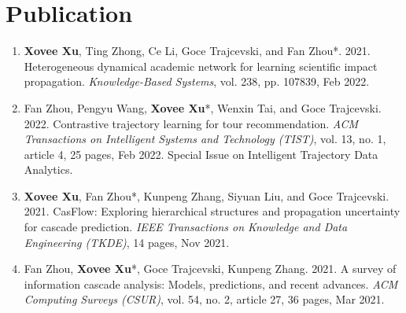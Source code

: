 \section*{Publication}
\indent



\begin{enumerate}[resume]
    \item \textbf{Xovee Xu}, Ting Zhong, Ce Li, Goce Trajcevski, and Fan Zhou*. 2021. Heterogeneous dynamical academic network for learning scientific impact propagation. \textit{Knowledge-Based Systems}, vol. 238, pp. 107839, Feb 2022.
    \item Fan Zhou, Pengyu Wang, \textbf{Xovee Xu}*, Wenxin Tai, and Goce Trajcevski. 2022. Contrastive trajectory learning for tour recommendation. \textit{ACM Transactions on Intelligent Systems and Technology (TIST)}, vol. 13, no. 1, article 4, 25 pages, Feb 2022. Special Issue on Intelligent Trajectory Data Analytics.
    \item \textbf{Xovee Xu}, Fan Zhou*, Kunpeng Zhang, Siyuan Liu, and Goce Trajcevski. 2021. CasFlow: Exploring hierarchical structures and propagation uncertainty for cascade prediction. \textit{IEEE Transactions on Knowledge and Data Engineering (TKDE)}, 14 pages, Nov 2021. 
    \item Fan Zhou, \textbf{Xovee Xu}*, Goce Trajcevski, Kunpeng Zhang. 2021. A survey of information cascade analysis: Models, predictions, and recent advances. \textit{ACM Computing Surveys (CSUR)}, vol. 54, no. 2, article 27, 36 pages, Mar 2021. 
\end{enumerate}


